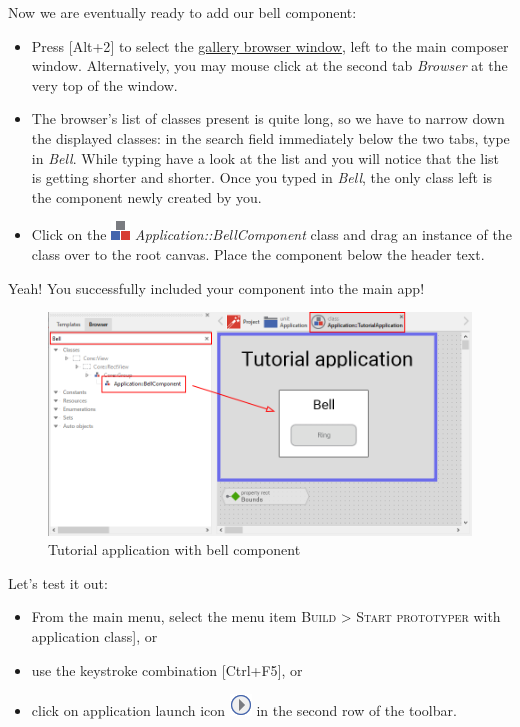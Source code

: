 \documentclass[
  a4paper,
,tablecaptionabove
]{scrbook}
\begin{document}
Now we are eventually ready to add our bell component:

\begin{itemize}
\item
  Press {[}Alt+2{]} to select the
  \href{https://doc.embedded-wizard.de/gallery-browser-window}{gallery
  browser window}, left to the main composer window. Alternatively, you
  may mouse click at the second tab \emph{Browser} at the very top of
  the window.
\item
  The browser's list of classes present is quite long, so we have to
  narrow down the displayed classes: in the search field immediately
  below the two tabs, type in \emph{Bell}. While typing have a look at
  the list and you will notice that the list is getting shorter and
  shorter. Once you typed in \emph{Bell}, the only class left is the
  component newly created by you.
\item
  Click on the
  \includegraphics{./../asciidoc/modules/ROOT/assets/images/icons/ClassIcon.png}
  \emph{Application::BellComponent} class and drag an instance of the
  class over to the root canvas. Place the component below the header
  text.
\end{itemize}

Yeah! You successfully included your component into the main app!

\begin{figure}
\centering
\includegraphics{./../asciidoc/modules/ROOT/assets/images/firstcomponent/TutorialApplication.png}
\caption{Tutorial application with bell component}
\end{figure}

Let's test it out:

\begin{itemize}
\item
  From the main menu, select the menu item \textsc{Build > Start prototyper}
  with application class{]}, or
\item
  use the keystroke combination {[}Ctrl+F5{]}, or
\item
  click on application launch icon
  \includegraphics{./../asciidoc/modules/ROOT/assets/images/icons/LaunchApplicationIcon.png}
  in the second row of the toolbar.
\end{itemize}
\end{document}

